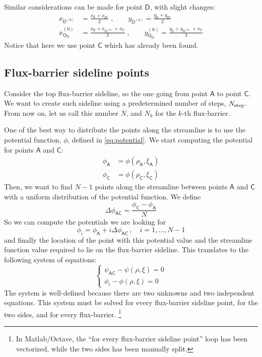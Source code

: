 \documentclass[b5paper,11pt,oneside,fleqn]{article}
\newcommand{\pt}[1]{\mathsf{#1}}
\newcommand{\Nstep}{N_{\textup{step}}}
\begin{document}
Similar considerations can be made for point $ \pt{D} $, with slight changes:
\begin{align}
x_\pt{D^{(0)}} &= \frac{x_\pt{E} + x_{\pt{D}'}}{2} \;,  \qquad
y_\pt{D^{(0)}} = \frac{y_\pt{E} + y_{\pt{D}'}}{2}  \\[1ex]
%
x_\pt{O_\pt{D}}^{(0)} &= \frac{x_\pt{E} + x_\pt{D^{(0)}} + x_\pt{C}}{3} 
\;, \qquad
y_\pt{O_\pt{D}}^{(0)} = \frac{y_\pt{E} + y_\pt{D^{(0)}} + x_\pt{C}}{3} 
\end{align}
Notice that here we use point $ \pt{C} $ which has already been found.


\subsection{Flux-barrier sideline points}

Consider the top flux-barrier sideline, so the one going from point $ \pt{A} $ 
to point $ \pt{C} $.
We want to create such sideline using a predetermined number of steps,
$ \Nstep $. From now on, let us call this number $ N $, 
and $ N_k $ for the $ k $-th flux-barrier.

One of the best way to distribute the points along the streamline is to use the 
potential function, $ \phi $, defined in \autoref{eq:potential}.
We start computing the potential for points $ \pt{A} $ and $ \pt{C} $:
\begin{equation*}
\begin{aligned}
\phi_\pt{A} &= \phi(\rho_\pt{A}, \xi_\pt{A}) \\
\phi_\pt{C} &= \phi(\rho_\pt{C}, \xi_\pt{C}) 
\end{aligned}
\end{equation*}
Then, we want to find $ N-1 $ points along the streamline
between points $ \pt{A} $ and $ \pt{C} $
with a uniform distribution of the potential function.
We define
\begin{equation*}
\Delta\phi_{\pt{AC}} = \frac{\phi_\pt{C} - \phi_\pt{A}}{N}
\end{equation*}
So we can compute the potentials we are looking for
\[
\phi_i = \phi_\pt{A} + i \Delta\phi_{\pt{AC}} \,,\quad i=1,\ldots,N-1
\]
and finally the location of the point with this potential value and the 
streamline function value required to lie on the flux-barrier sideline.
This translates to the following system of equations:
\begin{equation}
\begin{cases}
\psi_{\pt{AC}} - \psi(\rho,\xi) = 0 \\
\phi_i - \phi(\rho,\xi) = 0
\end{cases}
\end{equation}
The system is well-defined because there are two unknowns and two independent 
equations. This system must be solved for every flux-barrier sideline point, 
for the two sides, and for every flux-barrier.%
\footnote{In Matlab/Octave, the ``for every flux-barrier sideline point'' loop 
has been vectorized, while the two sides has been manually split.}
\end{document}

